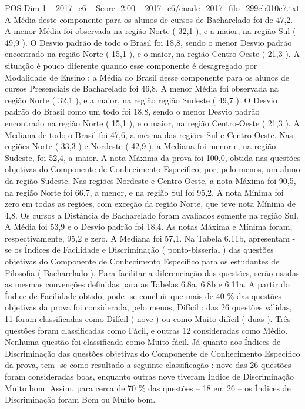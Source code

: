 \begin{textsample}{POS Dim 1 – 2017\_c6 – Score -2.00 – 2017\_c6/enade\_2017\_filo\_299cb010c7.txt}
A Média deste componente para os alunos de cursos de Bacharelado foi de 47,2.
A menor Média foi observada na região Norte ( 32,1 ), e a maior, na região Sul ( 49,9 ).
O Desvio padrão de todo o Brasil foi 18,8, sendo o menor Desvio padrão encontrado na região Norte ( 15,1 ), e o maior, na região Centro-Oeste ( 21,3 ).
A situação é pouco diferente quando esse componente é desagregado por Modalidade de Ensino : a Média do Brasil desse componente para os alunos de cursos Presenciais de Bacharelado foi 46,8.
A menor Média foi observada na região Norte ( 32,1 ), e a maior, na região região Sudeste ( 49,7 ).
O Desvio padrão do Brasil como um todo foi 18,8, sendo o menor Desvio padrão encontrado na região Norte ( 15,1 ), e o maior, na região Centro-Oeste ( 21,3 ).
A Mediana de todo o Brasil foi 47,6, a mesma das regiões Sul e Centro-Oeste.
Nas regiões Norte ( 33,3 ) e Nordeste ( 42,9 ), a Mediana foi menor e, na região Sudeste, foi 52,4, a maior.
A nota Máxima da prova foi 100,0, obtida nas questões objetivas do Componente de Conhecimento Específico, por, pelo menos, um aluno da região Sudeste.
Nas regiões Nordeste e Centro-Oeste, a nota Máxima foi 90,5, na região Norte foi 66,7, a menor, e na região Sul foi 95,2.
A nota Mínima foi zero em todas as regiões, com exceção da região Norte, que teve nota Mínima de 4,8.
Os cursos a Distância de Bacharelado foram avaliados somente na região Sul.
A Média foi 53,9 e o Desvio padrão foi 18,4.
As notas Máxima e Mínima foram, respectivamente, 95,2 e zero.
A Mediana foi 57,1.
Na Tabela 6.11b, apresentam -se os Índices de Facilidade e Discriminação ( ponto-bisserial ) das questões objetivas do Componente de Conhecimento Específico para os estudantes de Filosofia ( Bacharelado ).
Para facilitar a diferenciação das questões, serão usadas as mesmas convenções definidas para as Tabelas 6.8a, 6.8b e 6.11a.
A partir do Índice de Facilidade obtido, pode -se concluir que mais de 40 \% das questões objetivas da prova foi considerada, pelo menos, Difícil : das 26 questões válidas, 11 foram classificadas como Difícil ( nove ) ou como Muito difícil ( duas ).
Três questões foram classificadas como Fácil, e outras 12 consideradas como Médio.
Nenhuma questão foi classificada como Muito fácil.
Já quanto aos Índices de Discriminação das questões objetivas do Componente de Conhecimento Específico da prova, tem -se como resultado a seguinte classificação : nove das 26 questões foram consideradas boas, enquanto outras nove tiveram Índice de Discriminação Muito bom.
Assim, para cerca de 70 \% das questões – 18 em 26 – os Índices de Discriminação foram Bom ou Muito bom.

\end{textsample}
